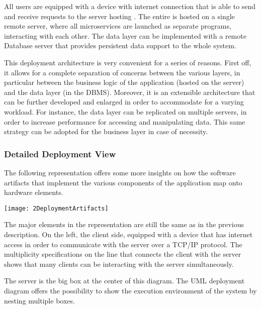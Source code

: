 All users are equipped with a device with internet connection that is able to send and receive requests to the server hosting \app. The entire \app is hosted on a single remote server, where all microservices are launched as separate programs, interacting with each other. The data layer can be implemented with a remote Database server that provides persistent data support to the whole system.

This deployment architecture is very convenient for a series of reasons. First off, it allows for a complete separation of concerns between the various layers, in particular between the business logic of the application (hosted on the server) and the data layer (in the DBMS). Moreover, it is an extensible architecture that can be further developed and enlarged in order to accommodate for a varying workload. For instance, the data layer can be replicated on multiple servers, in order to increase performance for accessing and manipulating data. This same strategy can be adopted for the business layer in case of necessity.

\subsubsection{Detailed Deployment View}

\begin{minipage}{\linewidth}
	The following representation offers some more insights on how the software artifacts that implement the various components of the \app application map onto hardware elements.
	
	\vspace{2cm}
	\texttt{[image: 2DeploymentArtifacts]}
	\vspace{1.5cm}
	
\end{minipage}

The major elements in the representation are still the same as in the previous description. On the left, the client side, equipped with a device that has internet access in order to communicate with the server over a TCP/IP protocol. The multiplicity specifications on the line that connects the client with the server shows that many clients can be interacting with the server simultaneously.

The server is the big box at the center of this diagram. The UML deployment diagram offers the possibility to show the execution environment of the \app system by nesting multiple boxes. 

